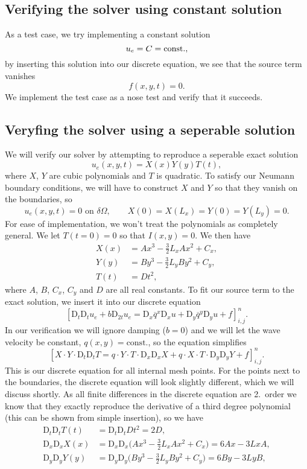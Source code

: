 \documentclass[a4paper, 11pt, notitlepage, english]{article}
\newcommand{\D}{\mbox{D}}
\begin{document}
\subsection*{Verifying the solver using constant solution}
As a test case, we try implementing a constant solution
$$u_e = C = {\rm const.},$$
by inserting this solution into our discrete equation, we see that the source term vanishes
$$f(x,y,t) = 0.$$
We implement the test case as a nose test and verify that it succeeds.

\subsection*{Veryfing the solver using a seperable solution}
We will verify our solver by attempting to reproduce a seperable exact solution
$$u_e(x,y,t) = X(x)Y(y)T(t),$$
where $X$, $Y$ are cubic polynomials and $T$ is quadratic. To satisfy our Neumann boundary conditions, we will have to construct $X$ and $Y$ so that they vanish on the boundaries, so
$$u_e(x,y,t) = 0 \mbox{ on } \delta\Omega, \qquad X(0)=X(L_x)=Y(0)=Y(L_y)=0.$$
For ease of implementation, we won't treat the polynomials as completely general. We let $T(t=0)=0$ so that $I(x,y)=0$. We then have
\begin{align*}
X(x) &= A x^3 -\frac{3}{2}L_xAx^2 + C_x, \\
Y(y) &= B y^3 -\frac{3}{2}L_yBy^2 + C_y, \\
T(t) &= D t^2,
\end{align*}
where $A$, $B$, $C_x$, $C_y$ and $D$ are all real constants. To fit our source term to the exact solution, we insert it into our discrete equation
$$[\D_t\D_t u_e + b\D_{2t}u_e = \D_x \overline{q}^{x}\D_x u + \D_y \overline{q}^y \D_y u + f]^{n}_{i,j}.$$
In our verification we will ignore damping ($b=0$) and we will let the wave velocity be constant, $q(x,y)=\mbox{const.}$, so the equation simplifies 
$$[X\cdot Y\cdot \D_t\D_t T = q\cdot  Y\cdot T\cdot  \D_x \D_x X + q\cdot  X\cdot T\cdot  \D_y \D_y Y + f]^{n}_{i,j}.$$
This is our discrete equation for all internal mesh points. For the points next to the boundaries, the discrete equation will look slightly different, 
which we will discuss shortly. As all finite differences in the discrete equation are 2.\ order we know that they exactly reproduce the derivative of 
a third degree polynomial (this can be shown from simple insertion), so we have
\begin{align*}
\D_t \D_t T(t) &= \D_t \D_t Dt^2 = 2D, \\
\D_x \D_x X(x) &= \D_x \D_x \bigg(A x^3 -\frac{3}{2}L_xAx^2 + C_x\bigg) = 6Ax - 3LxA, \\  
\D_y \D_y Y(y) &= \D_y \D_y \bigg(B y^3 -\frac{3}{2}L_yBy^2 + C_y\bigg) = 6By - 3LyB, \\  
\end{align*}
\end{document}

